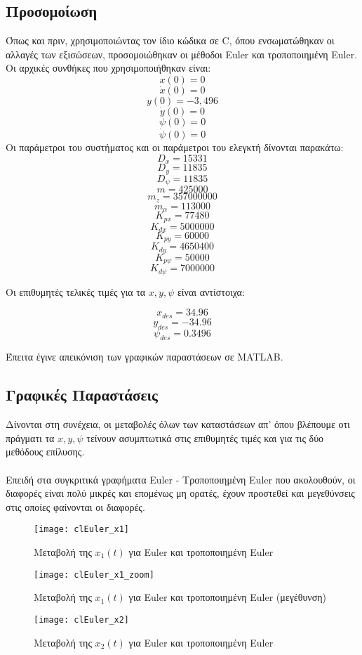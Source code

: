 \documentclass{article}
\begin{document}
\subsection{Προσομοίωση}
Όπως και πριν, χρησιμοποιώντας τον ίδιο κώδικα σε C, όπου ενσωματώθηκαν οι αλλαγές των εξισώσεων, προσομοιώθηκαν οι μέθοδοι Euler και τροποποιημένη Euler. Oι αρχικές συνθήκες που χρησιμοποιήθηκαν είναι:
\[x(0) = 0\]
\[\dot{x}(0) = 0\]
\[y(0) = -3,496\]
\[\dot{y}(0) = 0\]
\[\psi(0) = 0\]
\[\dot{\psi}(0) = 0\]
Οι παράμετροι του συστήματος και οι παράμετροι του ελεγκτή δίνονται παρακάτω:
\[D_x = 15331\]
\[D_y = 11835\]
\[D_\psi = 11835\]
\[m = 425000\]
\[m_z = 357000000\]
\[m_\alpha = 113000\]
\[K_{px} = 77480\]
\[K_{dx} = 5000000\]
\[K_{py} = 60000\]
\[K_{dy} = 4650400\]
\[K_{p\psi} = 50000\]
\[K_{d\psi} = 7000000\]

Οι επιθυμητές τελικές τιμές για τα \(x, y, \psi\) είναι αντίστοιχα: 

\[x_{des} = 34.96\]
\[y_{des} = -34.96\]
\[\psi_{des} = 0.3496\]

Έπειτα έγινε απεικόνιση των γραφικών παραστάσεων σε MATLAB.

\subsection{Γραφικές Παραστάσεις}
Δίνονται στη συνέχεια, οι μεταβολές όλων των καταστάσεων απ' όπου βλέπουμε οτι πράγματι τα \(x, y, \psi\) τείνουν ασυμπτωτικά στις επιθυμητές τιμές και για τις δύο μεθόδους επίλυσης. 
\\\\
Επειδή στα συγκριτικά γραφήματα Euler - Τροποποιημένη Euler που ακολουθούν, οι διαφορές είναι πολύ μικρές και επομένως μη ορατές, έχουν προστεθεί και μεγεθύνσεις στις οποίες φαίνονται οι διαφορές. 

\clearpage

\begin{figure}[bh!]
 \centering
\texttt{[image: clEuler\_x1]}
\caption{Μεταβολή της $x_1(t)$ για Euler και τροποποιημένη
 Euler}
\end{figure}

\begin{figure}[h!]
 \centering
\texttt{[image: clEuler\_x1\_zoom]}
\caption{Μεταβολή της $x_1(t)$ για Euler και τροποποιημένη Euler (μεγέθυνση)}
\end{figure}
\clearpage

\begin{figure}[bh!]
 \centering
\texttt{[image: clEuler\_x2]}
\caption{Μεταβολή της $x_2(t)$ για Euler και τροποποιημένη
 Euler}
\end{figure}
\end{document}
